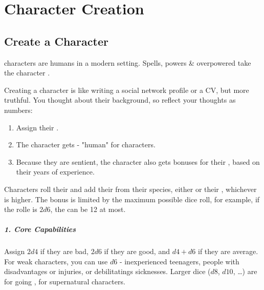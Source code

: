 \chapterspaceabove{2.75cm}
\chapterspacebelow{5.25cm}


\chapter{Character Creation}

\section{Create a  Character}
\begin{marginNote}
	 characters are humans in a modern setting.
	Spells, powers \& overpowered  take the character .
\end{marginNote}
Creating a character is like writing a social network profile or a CV, but more truthful.
You thought about their background, so reflect your thoughts as numbers:
\begin{enumerate}
	\item Assign their .
	\item The character gets  - "human" for  characters.
	\item Because they are sentient, the character also gets bonuses for their , based on their years of experience.
\end{enumerate}

Characters roll their  and
add their  from their species, either  or their , whichever is higher.
The bonus is limited by the maximum possible dice roll, for example, if the  rolle is $2d6$, the  can be 12 at most.

\paragraph*{1. Core Capabilities}

\begin{marginNote}
	
\end{marginNote}
Assign $2d4$ if they are bad,
$2d6$ if they are good, and $d4 + d6$ if they are average.
For weak characters, you can use $d6$ - inexperienced teenagers, people with disadvantages or injuries, or debilitatings sicknesses.
Larger dice ($d8$, $d10$, \ldots) are for going , for supernatural characters.

